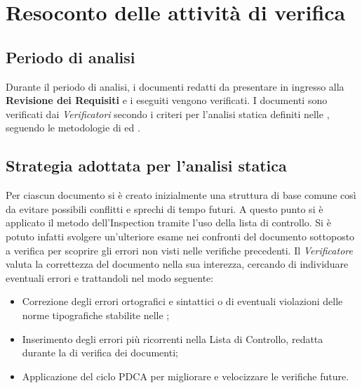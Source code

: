 \section{Resoconto delle attività di verifica}
\label{resoconto}
\subsection{Periodo di analisi}
Durante il periodo di analisi, i documenti redatti da presentare in ingresso alla \textbf{Revisione dei Requisiti} e i  eseguiti vengono verificati. I documenti sono verificati dai \textit{Verificatori} secondo i criteri per l'analisi statica definiti nelle , seguendo le metodologie di  ed .
\subsection{Strategia adottata per l'analisi statica}
Per ciascun documento si è creato inizialmente una struttura di base comune così da evitare possibili conflitti e sprechi di tempo futuri. A questo punto si è applicato il metodo dell'Inspection tramite l'uso della lista di controllo. Si è potuto infatti svolgere un’ulteriore esame nei confronti del documento sottoposto a verifica per scoprire gli errori non visti nelle verifiche precedenti. Il \textit{Verificatore} valuta la correttezza del documento nella sua interezza, cercando di individuare eventuali errori e trattandoli nel modo seguente:
	\begin{itemize}
		\item Correzione degli errori ortografici e sintattici o di eventuali violazioni delle norme tipografiche stabilite nelle ;
		\item Inserimento degli errori più ricorrenti nella Lista di Controllo, redatta durante la  di verifica dei documenti;
		\item Applicazione del ciclo PDCA per migliorare e velocizzare le verifiche future.
	\end{itemize}
